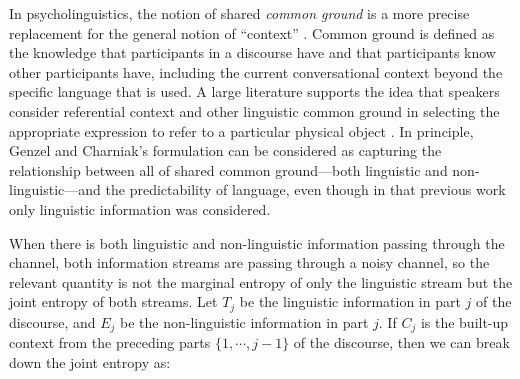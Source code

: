\documentclass[11pt,letterpaper]{article}
\begin{document}
In psycholinguistics, the notion of shared \emph{common ground} is a more precise replacement for the general notion of ``context'' \cite{clark1996}. Common ground is defined as the knowledge that participants in a discourse have and that participants know other participants have, including the current conversational context beyond the specific language that is used. A large literature supports the idea that speakers consider referential context and other linguistic common ground in selecting the appropriate expression to refer to a particular physical object \cite{brennan1996,metzing2003,dale1995,sedivy1999}. In principle, Genzel and Charniak's formulation can be considered as capturing the relationship between all of shared common ground---both linguistic and non-linguistic---and the predictability of language, even though in that previous work only linguistic information was considered. 

When there is both linguistic and non-linguistic information passing through the channel, both information streams are passing through a noisy channel, so the relevant quantity is not the marginal entropy of only the linguistic stream but the joint entropy of both streams.  Let $T_j$ be the linguistic information in part $j$ of the discourse, and $E_j$ be the non-linguistic information in part $j$.  If $C_j$ is the built-up context from the preceding parts $\{1,\cdots,j-1\}$ of the discourse, then we can break down the joint entropy as:
\end{document}
